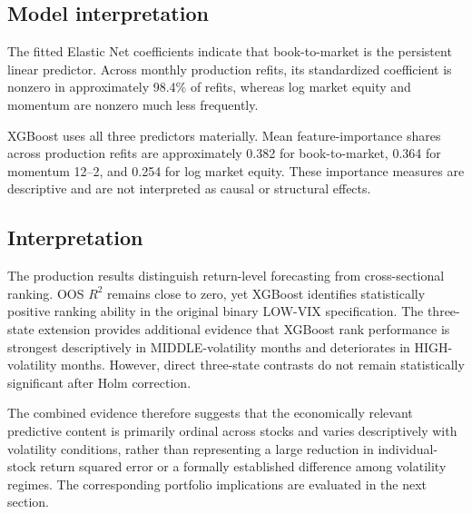 \subsection{Model interpretation}

The fitted Elastic Net coefficients indicate that book-to-market is the persistent linear predictor. Across monthly production refits, its standardized coefficient is nonzero in approximately 98.4\% of refits, whereas log market equity and momentum are nonzero much less frequently.

XGBoost uses all three predictors materially. Mean feature-importance shares across production refits are approximately 0.382 for book-to-market, 0.364 for momentum 12--2, and 0.254 for log market equity. These importance measures are descriptive and are not interpreted as causal or structural effects.

\subsection{Interpretation}

The production results distinguish return-level forecasting from cross-sectional ranking. OOS $R^2$ remains close to zero, yet XGBoost identifies statistically positive ranking ability in the original binary LOW-VIX specification. The three-state extension provides additional evidence that XGBoost rank performance is strongest descriptively in MIDDLE-volatility months and deteriorates in HIGH-volatility months. However, direct three-state contrasts do not remain statistically significant after Holm correction.

The combined evidence therefore suggests that the economically relevant predictive content is primarily ordinal across stocks and varies descriptively with volatility conditions, rather than representing a large reduction in individual-stock return squared error or a formally established difference among volatility regimes. The corresponding portfolio implications are evaluated in the next section.